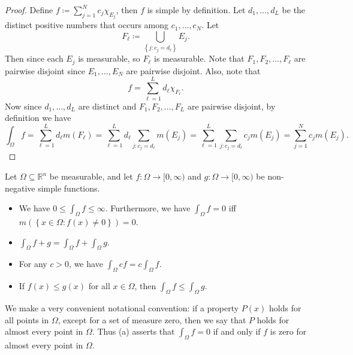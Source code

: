 \begin{proof}
    Define \(f \coloneqq \sum_{j=1}^N c_j \chi _{E_j}\), then \(f\) is simple by definition. Let \(d_1, \dots , d_L\) be the distinct positive numbers that occurs among \(c_1, \dots , c_N\). Let 
    \[
        F_{\ell } \coloneqq \bigcup_{\left\{ j: c_j = d_{\ell}  \right\} } E_j. 
    \]    
    Then since each \(E_j\) is measurable, so \(F_{\ell}\) is measurable. Note that \(F_1, F_2, \dots , F_{\ell}\) are pairwise disjoint since \(E_1, \dots , E_N\) are pairwise disjoint. Also, note that 
    \[
        f = \sum_{\ell = 1}^L d_{\ell} \chi _{F_{\ell}}. 
    \] 
    Now since \(d_1, \dots , d_{L}\) are distinct and \(F_1, F_2, \dots , F_{L} \) are pairwise disjoint, by definition we have 
    \[
        \int_{\Omega} f = \sum_{\ell = 1}^L d_{\ell} m(F_{\ell}) = \sum_{\ell = 1}^L d_{\ell} \sum_{j: c_j = d_{\ell} } m(E_j)  = \sum_{\ell = 1}^L \sum_{j: c_j = d_{\ell}} c_j m(E_j) = \sum_{j=1}^N c_j m(E_j).    
    \]    
\end{proof}

\begin{proposition}
    Let \(\Omega \subseteq \mathbb{R} ^n\) be measurable, and let \(f: \Omega \to [0, \infty) \) and \(g: \Omega \to [0, \infty)\) be non-negative simple functions. 
    \begin{itemize}
        \item [(a)] We have \(0 \le \int_{\Omega} f \le \infty\). Furthermore, we have \(\int _\Omega f = 0\) iff \(m(\left\{ x \in \Omega: f(x) \neq 0 \right\} ) = 0\).   
        \item [(b)] \(\int _\Omega f + g = \int _\Omega f + \int _\Omega g\).
        \item [(c)] For any \(c > 0\), we have \(\int _\Omega cf = c \int _{\Omega} f\).
        \item [(d)] If \(f(x) \le g(x)\) for all \(x \in \Omega\), then \(\int _\Omega f \le \int _\Omega g\).      
    \end{itemize}   
    \begin{remark}
        We make a very convenient notational convention: if a property \(P(x)\) holds for all points in \(\Omega\), except for a set of measure zero, then we say that \(P\) holds for almost every point in \(\Omega\). Thus (a) asserts that \(\int _\Omega f = 0\) if and only if \(f\) is zero for almost every point in \(\Omega\).
    \end{remark}
\end{proposition}

